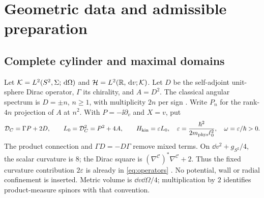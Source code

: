 \section{Geometric data and admissible preparation}\label{sec:preparation}

\subsection{Complete cylinder and maximal domains}
Let $\mathcal K=L^2(S^2,\Sigma;\,\mathrm d\Omega)$ and
$\mathcal H=L^2(\mathbb R,\,\mathrm d v;\mathcal K)$. Let $D$ be the self-adjoint unit-sphere Dirac
operator, $\Gamma$ its chirality, and $A=D^2$. The classical angular spectrum
is $D=\pm n$, $n\ge1$, with multiplicity $2n$ per sign
\cite[(3.40), (3.54)]{CamporesiHiguchi1996}. Write $P_n$ for the rank-$4n$
projection of $A$ at $n^2$. With $P=-\ii\partial_v$ and $X=v$, put
\begin{equation}\label{eq:operators}
 \mathcal D_C=\Gamma P+2D,\qquad L_0=\mathcal D_C^2=P^2+4A,\qquad
 H_{\rm kin}=\varepsilon L_0,\quad
 \varepsilon=\frac{\hbar^2}{2m_{\rm phys}\ell_0^2},\quad
 \omega=\varepsilon/\hbar>0.
\end{equation}
The product connection and $\Gamma D=-D\Gamma$ remove mixed terms. On
$\dd v^2+g_{S^2}/4$, the scalar curvature is $8$; the Dirac square is
$(\nabla^{\mathcal C})^*\nabla^{\mathcal C}+2$. Thus the fixed curvature
contribution $2\varepsilon$ is already in \eqref{eq:operators}
\cite{TNDBackground,TNDParent}. No potential, wall or radial confinement
is inserted. Metric volume is $\dd v\dd\Omega/4$; multiplication by $2$
identifies product-measure spinors with that convention.

